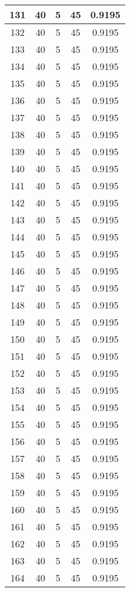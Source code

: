 \documentclass[letterpaper, 12pt]{article}
\begin{document}
\begin{longtable}{|c|c|c|c|c|}
\hline
131 & 40 & 5 & 45 & 0.9195 \\
\hline
132 & 40 & 5 & 45 & 0.9195 \\
\hline
133 & 40 & 5 & 45 & 0.9195 \\
\hline
134 & 40 & 5 & 45 & 0.9195 \\
\hline
135 & 40 & 5 & 45 & 0.9195 \\
\hline
136 & 40 & 5 & 45 & 0.9195 \\
\hline
137 & 40 & 5 & 45 & 0.9195 \\
\hline
138 & 40 & 5 & 45 & 0.9195 \\
\hline
139 & 40 & 5 & 45 & 0.9195 \\
\hline
140 & 40 & 5 & 45 & 0.9195 \\
\hline
141 & 40 & 5 & 45 & 0.9195 \\
\hline
142 & 40 & 5 & 45 & 0.9195 \\
\hline
143 & 40 & 5 & 45 & 0.9195 \\
\hline
144 & 40 & 5 & 45 & 0.9195 \\
\hline
145 & 40 & 5 & 45 & 0.9195 \\
\hline
146 & 40 & 5 & 45 & 0.9195 \\
\hline
147 & 40 & 5 & 45 & 0.9195 \\
\hline
148 & 40 & 5 & 45 & 0.9195 \\
\hline
149 & 40 & 5 & 45 & 0.9195 \\
\hline
150 & 40 & 5 & 45 & 0.9195 \\
\hline
151 & 40 & 5 & 45 & 0.9195 \\
\hline
152 & 40 & 5 & 45 & 0.9195 \\
\hline
153 & 40 & 5 & 45 & 0.9195 \\
\hline
154 & 40 & 5 & 45 & 0.9195 \\
\hline
155 & 40 & 5 & 45 & 0.9195 \\
\hline
156 & 40 & 5 & 45 & 0.9195 \\
\hline
157 & 40 & 5 & 45 & 0.9195 \\
\hline
158 & 40 & 5 & 45 & 0.9195 \\
\hline
159 & 40 & 5 & 45 & 0.9195 \\
\hline
160 & 40 & 5 & 45 & 0.9195 \\
\hline
161 & 40 & 5 & 45 & 0.9195 \\
\hline
162 & 40 & 5 & 45 & 0.9195 \\
\hline
163 & 40 & 5 & 45 & 0.9195 \\
\hline
164 & 40 & 5 & 45 & 0.9195 \\

\end{longtable}
\end{document}
